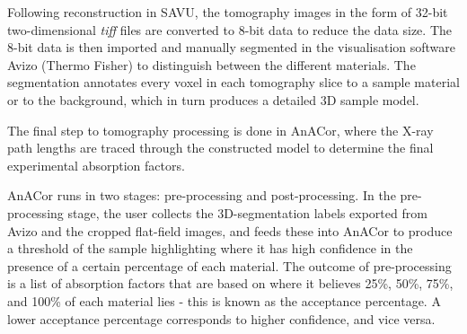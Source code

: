 Following reconstruction in SAVU, the tomography images in the form of 32-bit two-dimensional \textit{tiff} files are converted to 8-bit data to reduce the data size. The 8-bit data is then imported and manually segmented in the visualisation software Avizo (Thermo Fisher) to distinguish between the different materials. The segmentation annotates every voxel in each tomography slice to a sample material or to the background, which in turn produces a detailed 3D sample model.


The final step to tomography processing is done in AnACor, where the X-ray path lengths are traced through the constructed model to determine the final experimental absorption factors.

AnACor runs in two stages: pre-processing and post-processing. In the pre-processing stage, the user collects the 3D-segmentation labels exported from Avizo and the cropped flat-field images, and feeds these into AnACor to produce a threshold of the sample highlighting where it has high confidence in the presence of a certain percentage of each material. The outcome of pre-processing is a list of absorption factors that are based on where it believes 25\%, 50\%, 75\%, and 100\% of each material lies - this is known as the acceptance percentage. A lower acceptance percentage corresponds to higher confidence, and vice versa. %

